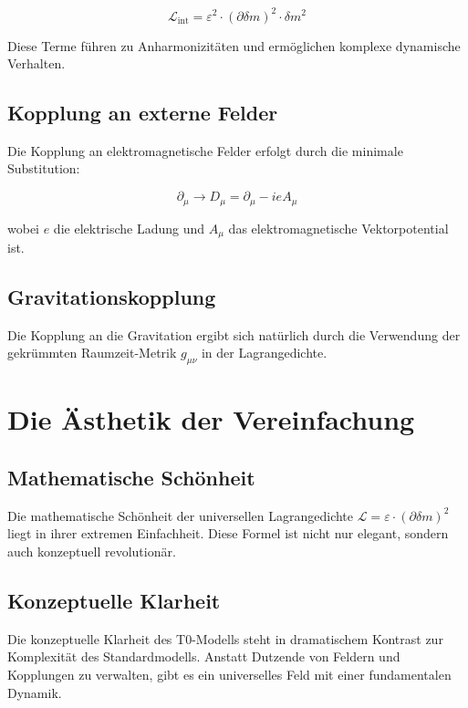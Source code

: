 \documentclass[12pt,a4paper]{report}
\begin{document}
	\begin{equation}
		\mathcal{L}_{\text{int}} = \varepsilon^2 \cdot (\partial\delta m)^2 \cdot \delta m^2
	\end{equation}
	
	Diese Terme führen zu Anharmonizitäten und ermöglichen komplexe dynamische Verhalten.
	
	\subsection{Kopplung an externe Felder}
	
	Die Kopplung an elektromagnetische Felder erfolgt durch die minimale Substitution:
	
	\begin{equation}
		\partial_\mu \to D_\mu = \partial_\mu - ieA_\mu
	\end{equation}
	
	wobei $e$ die elektrische Ladung und $A_\mu$ das elektromagnetische Vektorpotential ist.
	
	\subsection{Gravitationskopplung}
	
	Die Kopplung an die Gravitation ergibt sich natürlich durch die Verwendung der gekrümmten Raumzeit-Metrik $g_{\mu\nu}$ in der Lagrangedichte.
	
	\section{Die Ästhetik der Vereinfachung}
	
	\subsection{Mathematische Schönheit}
	
	Die mathematische Schönheit der universellen Lagrangedichte $\mathcal{L} = \varepsilon \cdot (\partial\delta m)^2$ liegt in ihrer extremen Einfachheit. Diese Formel ist nicht nur elegant, sondern auch konzeptuell revolutionär.
	
	\subsection{Konzeptuelle Klarheit}
	
	Die konzeptuelle Klarheit des T0-Modells steht in dramatischem Kontrast zur Komplexität des Standardmodells. Anstatt Dutzende von Feldern und Kopplungen zu verwalten, gibt es ein universelles Feld mit einer fundamentalen Dynamik.
	
\end{document}
